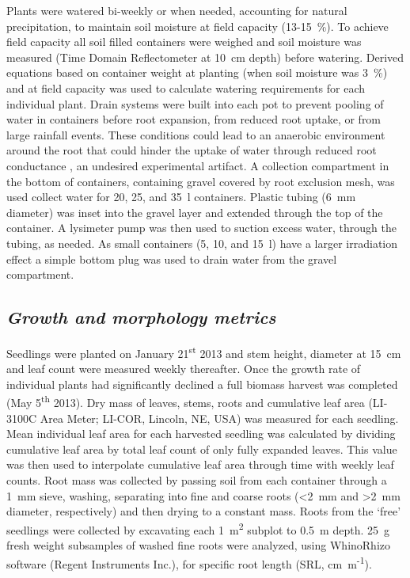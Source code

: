 \documentclass[a4paper]{article}\usepackage[]{graphicx}\usepackage[]{color}
\begin{document}
Plants were watered bi-weekly or when needed, accounting for natural precipitation, to maintain soil moisture at field capacity (13-15~\%). To achieve field capacity all soil filled containers were weighed and soil moisture was measured (Time Domain Reflectometer at 10~cm depth) before watering. Derived equations based on container weight at planting (when soil moisture was 3~\%) and at field capacity was used to calculate watering requirements for each individual plant. Drain systems were built into each pot to prevent pooling of water in containers before root expansion, from reduced root uptake, or from large rainfall events. These conditions could lead to an anaerobic environment around the root that could hinder the uptake of water through reduced root conductance \citep{poorter2009causes}, an undesired experimental artifact. A collection compartment in the bottom of containers, containing gravel covered by root exclusion mesh, was used collect water for 20, 25, and 35~l containers. Plastic tubing (6~mm diameter) was inset into the gravel layer and extended through the top of the container. A lysimeter pump was then used to suction excess water, through the tubing, as needed. As small containers (5, 10, and 15~l) have a larger irradiation effect a simple bottom plug was used to drain water from the gravel compartment.  

\subsection*{\textit{Growth and morphology metrics}}
Seedlings were planted on January 21\textsuperscript{st} 2013 and stem height, diameter at 15~cm and leaf count were measured weekly thereafter. Once the growth rate of individual plants had significantly declined a full biomass harvest was completed (May 5\textsuperscript{th} 2013). Dry mass of leaves, stems, roots and cumulative leaf area (LI-3100C Area Meter; LI-COR, Lincoln, NE, USA) was measured for each seedling. Mean individual leaf area for each harvested seedling was calculated by dividing cumulative leaf area by total leaf count of only fully expanded leaves. This value was then used to interpolate cumulative leaf area through time with weekly leaf counts. Root mass was collected by passing soil from each container through a 1~mm sieve, washing, separating into fine and coarse roots (\textless2~mm and \textgreater2~mm diameter, respectively) and then drying to a constant mass. Roots from the ‘free’ seedlings were collected by excavating each 1~m\textsuperscript{2} subplot to 0.5~m depth.  25~g fresh weight subsamples of washed fine roots were analyzed, using WhinoRhizo software (Regent Instruments Inc.), for specific root length (SRL, cm~m\textsuperscript{-1}).
\end{document}
